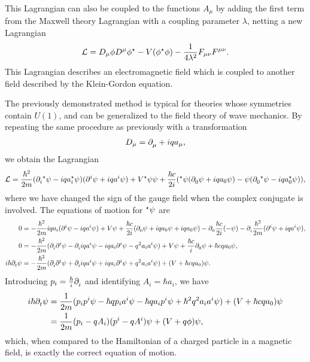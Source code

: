 This Lagrangian can also be coupled to the functions $A_{\mu}$ by adding the first term from the Maxwell theory Lagrangian with a coupling parameter $\lambda$, netting a new Lagrangian
\begin{align*}
	\mathcal{L} = D_{\mu}\phi D^{\mu}\phi^{\star} - V(\phi^{\star}\phi) - \frac{1}{4\lambda^{2}}F_{\mu\nu}F^{\mu\nu}.
\end{align*}
This Lagrangian describes an electromagnetic field which is coupled to another field described by the Klein-Gordon equation.

The previously demonstrated method is typical for theories whose symmetries contain $U(1)$, and can be generalized to the field theory of wave mechanics. By repeating the same procedure as previously with a transformation
\begin{align*}
	D_{\mu} = \partial^{}_{\mu}{} + iqa_{\mu},
\end{align*}
we obtain the Lagrangian
\begin{align*}
	\mathcal{L} = \frac{\hbar^{2}}{2m}(\partial^{}_{i}{^{\star}{\psi}} - iqa_{i}^{\star}{\psi})(\partial^{i}_{}{\psi} + iqa^{i}\psi) + V^{\star}{\psi}\psi + \frac{\hbar c}{2i}(^{\star}{\psi}(\partial^{}_{0}{\psi} + iqa_{0}\psi) - \psi(\partial^{}_{0}{^{\star}{\psi}} - iqa_{0}^{\star}{\psi})),
\end{align*}
where we have changed the sign of the gauge field when the complex conjugate is involved. The equations of motion for $^{\star}{\psi}$ are
\begin{align*}
	0 &= -\frac{\hbar^{2}}{2m}iqa_{i}(\partial^{i}_{}{\psi} - iqa^{i}\psi) + V\psi + \frac{\hbar c}{2i}(\partial^{}_{0}{\psi} + iqa_{0}\psi + iqa_{0}\psi) - \partial^{}_{0}{\frac{\hbar c}{2i}( - \psi)} - \partial^{}_{i}{\frac{\hbar^{2}}{2m}(\partial^{i}_{}{\psi} + iqa^{i}\psi)}, \\
	0 &= -\frac{\hbar^{2}}{2m}(\partial^{}_{i}{\partial^{i}_{}{\psi}} - \partial^{}_{i}{iqa^{i}\psi} - iqa_{i}\partial^{i}_{}{\psi} - q^{2}a_{i}a^{i}\psi) + V\psi + \frac{\hbar c}{i}\partial^{}_{0}{\psi} + \hbar cqa_{0}\psi, \\
	i\hbar\partial^{}_{t}{\psi} &= -\frac{\hbar^{2}}{2m}(\partial^{}_{i}{\partial^{i}_{}{\psi}} + \partial^{}_{i}{iqa^{i}\psi} + iqa_{i}\partial^{i}_{}{\psi} + q^{2}a_{i}a^{i}\psi) + (V + \hbar cqa_{0})\psi.
\end{align*}
Introducing $p_{i} = \frac{\hbar}{i}\partial^{}_{i}{}$ and identifying $A_{i} = \hbar a_{i}$, we have
\begin{align*}
	i\hbar\partial^{}_{t}{\psi} &= \frac{1}{2m}(p_{i}p^{i}\psi - \hbar qp_{i}a^{i}\psi - \hbar qa_{i}p^{i}\psi + \hbar^{2}q^{2}a_{i}a^{i}\psi) + (V + \hbar cqa_{0})\psi \\
	                    &= \frac{1}{2m}(p_{i} - qA_{i})(p^{i} - qA^{i})\psi + (V + q\phi)\psi,
\end{align*}
which, when compared to the Hamiltonian of a charged particle in a magnetic field, is exactly the correct equation of motion.

